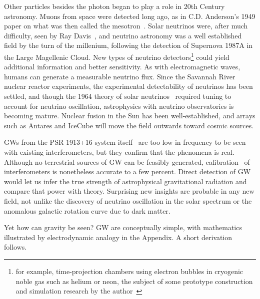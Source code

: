 Other particles besides the photon began to play a role in 20th Century astronomy.
Muons from space were detected long ago, as in C.D. Anderson's 1949 paper on what was then called the mesotron~\cite{CDAnderson}. 
Solar neutrinos were, after much difficulty, seen by Ray Davis~\cite{NeutrinoReview}, and neutrino astronomy was a well established field by the turn of the millenium, following the detection of Supernova 1987A in the Large Magellenic Cloud. 
New types of neutrino detectors\footnote{for example, time-projection chambers using electron bubbles in cryogenic noble gas such as helium or neon, the subject of some prototype construction and simulation research by the author~\cite{EBubble2005,MeadorsNevis2006}} could yield additional information and better sensitivity.
As with electromagnetic waves, humans can generate a measurable neutrino flux. 
Since the Savannah River nuclear reactor experiments, the experimental detectability of neutrinos has been settled, and though the 1964 theory of solar neutrinos~\cite{NeutrinosSolarTheoretical} required tuning to account for neutrino oscillation, astrophysics with neutrino observatories is becoming mature.
Nuclear fusion in the Sun has been well-established, and arrays such as Antares and IceCube will move the field outwards toward cosmic sources.


 GWs from the PSR 1913+16 system itself~\cite{WeisbergTaylor2004} are too low in frequency to be seen with existing interferometers, but they confirm that the phenomena is real.
Although no terrestrial sources of GW can be feasibly generated, calibration~\cite{AbadieCalibration2010} of interferometers is nonetheless accurate to a few percent.
Direct detection of GW would let us infer the true strength of astrophysical gravitational radiation and compare that power with theory. 
Surprising new insights are probable in any new field, not unlike the discovery of neutrino oscillation in the solar spectrum or the anomalous galactic rotation curve due to dark matter.

Yet how can gravity be seen?
GW are conceptually simple, with mathematics illustrated by electrodynamic analogy in the Appendix.
A short derivation follows.




